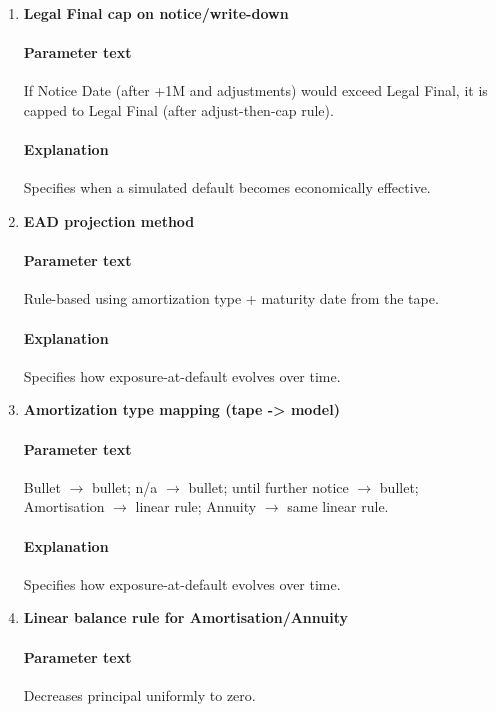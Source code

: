 \documentclass[11pt]{article}
\begin{document}
\begin{enumerate}[label=\arabic*),leftmargin=*,align=left]
\paragraph{Explanation} Defines a required parameter or rule that must be implemented exactly as stated.

\item \textbf{Legal Final cap on notice/write-down}
\paragraph{Parameter text} If Notice Date (after +1M and adjustments) would exceed Legal Final, it is capped to Legal Final (after adjust-then-cap rule).
\paragraph{Explanation} Specifies when a simulated default becomes economically effective.

\item \textbf{EAD projection method}
\paragraph{Parameter text} Rule-based using amortization type + maturity date from the tape.
\paragraph{Explanation} Specifies how exposure-at-default evolves over time.

\item \textbf{Amortization type mapping (tape -> model)}
\paragraph{Parameter text} Bullet $\rightarrow$ bullet; n/a $\rightarrow$ bullet; until further notice $\rightarrow$ bullet; Amortisation $\rightarrow$ linear rule; Annuity $\rightarrow$ same linear rule.
\paragraph{Explanation} Specifies how exposure-at-default evolves over time.

\item \textbf{Linear balance rule for Amortisation/Annuity}
\paragraph{Parameter text} Decreases principal uniformly to zero.

\end{enumerate}
\end{document}
